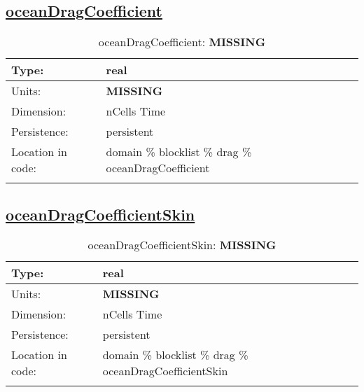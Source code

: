 \subsection[oceanDragCoefficient]{\hyperref[sec:var_tab_drag]{oceanDragCoefficient}}
\label{subsec:var_sec_drag_oceanDragCoefficient}
\begin{center}
\begin{longtable}{| p{2.0in} | p{4.0in} |}
        \hline 
        Type: & real \\
        \hline 
        Units: & {\bf \color{red} MISSING} \\
        \hline 
        Dimension: & nCells Time \\
        \hline 
        Persistence: & persistent \\
        \hline 
         Location in code: & domain \% blocklist \% drag \% oceanDragCoefficient \\
         \hline 
    \caption{oceanDragCoefficient: {\bf \color{red} MISSING}}
\end{longtable}
\end{center}
\subsection[oceanDragCoefficientSkin]{\hyperref[sec:var_tab_drag]{oceanDragCoefficientSkin}}
\label{subsec:var_sec_drag_oceanDragCoefficientSkin}
\begin{center}
\begin{longtable}{| p{2.0in} | p{4.0in} |}
        \hline 
        Type: & real \\
        \hline 
        Units: & {\bf \color{red} MISSING} \\
        \hline 
        Dimension: & nCells Time \\
        \hline 
        Persistence: & persistent \\
        \hline 
         Location in code: & domain \% blocklist \% drag \% oceanDragCoefficientSkin \\
         \hline 
    \caption{oceanDragCoefficientSkin: {\bf \color{red} MISSING}}
\end{longtable}
\end{center}

